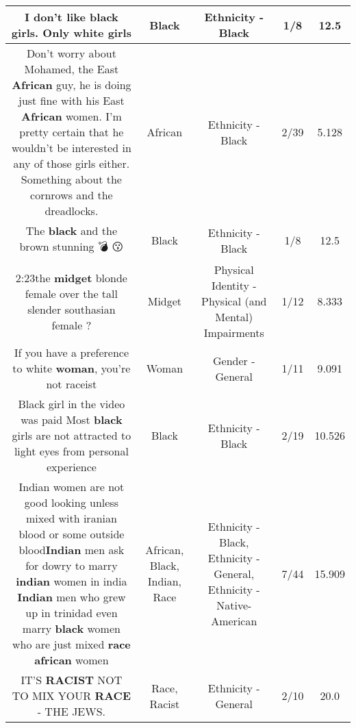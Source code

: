 \documentclass[11pt]{article}
\newlength\mylength
\begin{document}
\begin{center}
\begin{longtable}{|C{.65\mylength}|C{.30\mylength}|C{.12\mylength}|C{.12\mylength}|C{.12\mylength}|}
  \small I don't like \textbf{black} girls. Only white girls\normalsize   & Black & Ethnicity - Black & 1/8 & 12.5 \\  \hline
  \small Don't worry about Mohamed, the East \textbf{African} guy, he is doing just fine with his East \textbf{African} women. I'm pretty certain that he wouldn't be interested in any of those girls either. Something about the cornrows and the dreadlocks.\normalsize   & African & Ethnicity - Black & 2/39 & 5.128 \\  \hline
  \small The \textbf{black} and the brown stunning 💣 😗\normalsize   & Black & Ethnicity - Black & 1/8 & 12.5 \\  \hline
  \small 2:23the \textbf{midget} blonde female over the tall slender southasian female ?\normalsize   & Midget & Physical Identity - Physical (and Mental) Impairments & 1/12 & 8.333 \\  \hline
  \small If you have a preference to white \textbf{woman}, you're not raceist\normalsize   & Woman & Gender - General & 1/11 & 9.091 \\  \hline
  \small Black girl in the video was paid Most \textbf{black} girls are not attracted to light eyes from personal experience\normalsize   & Black & Ethnicity - Black & 2/19 & 10.526 \\  \hline
  \small Indian women are not good looking unless mixed with iranian blood or some outside blood\textbf{Indian} men ask for dowry to marry \textbf{indian} women in india \textbf{Indian} men who grew up in trinidad even marry \textbf{black} women who are just mixed \textbf{race} \textbf{african} women\normalsize   & African, Black, Indian, Race & Ethnicity - Black, Ethnicity - General, Ethnicity - Native-American & 7/44 & 15.909 \\  \hline
  \small IT'S \textbf{RACIST} NOT TO MIX YOUR \textbf{RACE} -  THE JEWS.\normalsize   & Race, Racist & Ethnicity - General & 2/10 & 20.0 \\  \hline

\end{longtable}
\end{center}
\end{document}
